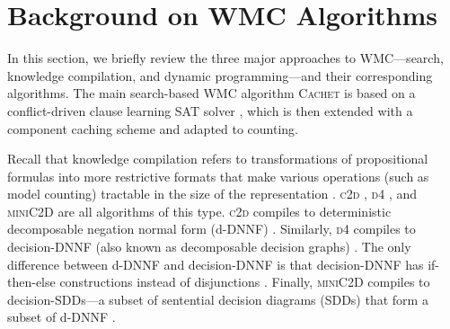 
\section{Background on WMC Algorithms}\label{sec:background}

In this section, we briefly review the three major approaches to WMC---search,
knowledge compilation, and dynamic programming---and their corresponding
algorithms. The main search-based WMC algorithm \textsc{Cachet}
\citep{DBLP:conf/sat/SangBBKP04} is based on a conflict-driven clause learning
SAT solver \citep{DBLP:conf/dac/MoskewiczMZZM01}, which is then extended with a
component caching scheme and adapted to counting.

Recall that knowledge compilation refers to transformations of propositional
formulas into more restrictive formats that make various operations (such as
model counting) tractable in the size of the representation
\citep{DBLP:journals/jair/DarwicheM02}. \textsc{c2d}
\citep{DBLP:conf/ecai/Darwiche04}, \textsc{d4}
\citep{DBLP:conf/ijcai/LagniezM17}, and \textsc{miniC2D}
\citep{DBLP:conf/ijcai/OztokD15} are all algorithms of this type. \textsc{c2d}
compiles to deterministic decomposable negation normal form (d-DNNF)
\citep{DBLP:journals/jancl/Darwiche01}. Similarly, \textsc{d4} compiles to
decision-DNNF (also known as decomposable decision graphs)
\citep{DBLP:conf/aaai/FargierM06}. The only difference between d-DNNF and
decision-DNNF is that decision-DNNF has if-then-else constructions instead of
disjunctions \citep{DBLP:conf/ijcai/LagniezM17}. Finally, \textsc{miniC2D}
compiles to decision-SDDs---a subset of sentential decision diagrams (SDDs) that
form a subset of d-DNNF \citep{DBLP:conf/ijcai/Darwiche11}.

